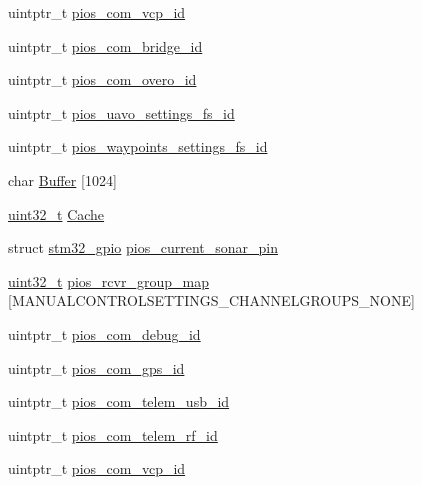 \begin{DoxyCompactItemize}
\item 
uintptr\-\_\-t \hyperlink{group___open_pilot_core_gaaeb3e0d65ed5c6e7b921c54e1ad905db}{pios\-\_\-com\-\_\-vcp\-\_\-id}
\item 
uintptr\-\_\-t \hyperlink{group___open_pilot_core_gac040f05fa048688ee0269c2768698a14}{pios\-\_\-com\-\_\-bridge\-\_\-id}
\item 
uintptr\-\_\-t \hyperlink{group___open_pilot_core_ga048f2bb98de60944f135effb407a1139}{pios\-\_\-com\-\_\-overo\-\_\-id}
\item 
uintptr\-\_\-t \hyperlink{group___open_pilot_core_gab060f441dd600b08386c0ca1b487217a}{pios\-\_\-uavo\-\_\-settings\-\_\-fs\-\_\-id}
\item 
uintptr\-\_\-t \hyperlink{group___open_pilot_core_ga4b04979e5fb31eaa66088178605835cd}{pios\-\_\-waypoints\-\_\-settings\-\_\-fs\-\_\-id}
\item 
char \hyperlink{group___open_pilot_core_gaaf1490d688e7cf0c41987d87572ff80a}{Buffer} \mbox{[}1024\mbox{]}
\item 
\hyperlink{stdint_8h_a435d1572bf3f880d55459d9805097f62}{uint32\-\_\-t} \hyperlink{group___open_pilot_core_gaef8c3e152589675df7f5b49cc1ba7ffd}{Cache}
\item 
struct \hyperlink{structstm32__gpio}{stm32\-\_\-gpio} \hyperlink{group___open_pilot_core_ga606e58ec5cbb14b404f825ca313fb71e}{pios\-\_\-current\-\_\-sonar\-\_\-pin}
\item 
\hyperlink{stdint_8h_a435d1572bf3f880d55459d9805097f62}{uint32\-\_\-t} \hyperlink{group___open_pilot_core_ga6c6cfc16eb738e47c123298e062297e2}{pios\-\_\-rcvr\-\_\-group\-\_\-map} \mbox{[}M\-A\-N\-U\-A\-L\-C\-O\-N\-T\-R\-O\-L\-S\-E\-T\-T\-I\-N\-G\-S\-\_\-\-C\-H\-A\-N\-N\-E\-L\-G\-R\-O\-U\-P\-S\-\_\-\-N\-O\-N\-E\mbox{]}
\item 
uintptr\-\_\-t \hyperlink{group___open_pilot_core_ga14dc9e3d330b80a37a9699c2112358e0}{pios\-\_\-com\-\_\-debug\-\_\-id}
\item 
uintptr\-\_\-t \hyperlink{group___open_pilot_core_ga05dca72c42c6c2b33fa62b8ee0fcb2ea}{pios\-\_\-com\-\_\-gps\-\_\-id}
\item 
uintptr\-\_\-t \hyperlink{group___open_pilot_core_ga513cc36d72b76de2fcb75ff233a79a4a}{pios\-\_\-com\-\_\-telem\-\_\-usb\-\_\-id}
\item 
uintptr\-\_\-t \hyperlink{group___open_pilot_core_gae48e848f715b08971e23528feee79339}{pios\-\_\-com\-\_\-telem\-\_\-rf\-\_\-id}
\item 
uintptr\-\_\-t \hyperlink{group___open_pilot_core_gaaeb3e0d65ed5c6e7b921c54e1ad905db}{pios\-\_\-com\-\_\-vcp\-\_\-id}

\end{DoxyCompactItemize}
